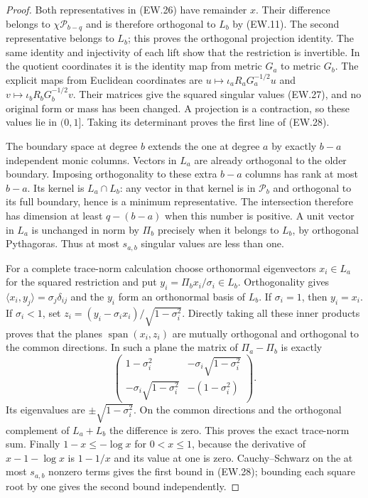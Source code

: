 \begin{proof}
Both representatives in (EW.26) have remainder $x$. Their difference
belongs to $\chi\mathcal P_{b-q}$ and is therefore orthogonal to
$L_b$ by (EW.11). The second representative belongs to $L_b$;
this proves the orthogonal projection identity. The same identity
and injectivity of each lift show that the restriction is invertible.
In the quotient coordinates it is the identity map from metric
$G_a$ to metric $G_b$. The explicit maps from Euclidean coordinates
are $u\mapsto\iota_aR_aG_a^{-1/2}u$ and
$v\mapsto\iota_bR_bG_b^{-1/2}v$. Their matrices give the squared
singular values (EW.27), and no original form or mass has been
changed. A projection is a contraction, so these values lie in
$(0,1]$. Taking its determinant proves the first line of (EW.28).

The boundary space at degree $b$ extends the one at degree $a$ by
exactly $b-a$ independent monic columns. Vectors in $L_a$ are
already orthogonal to the older boundary. Imposing orthogonality to
these extra $b-a$ columns has rank at most $b-a$. Its kernel is
$L_a\cap L_b$: any vector in that kernel is in $\mathcal P_b$
and orthogonal to its full boundary, hence is a minimum representative.
The intersection therefore has dimension at least $q-(b-a)$ when
this number is positive. A unit vector in $L_a$ is unchanged in
norm by $\Pi_b$ precisely when it belongs to $L_b$, by orthogonal
Pythagoras. Thus at most $s_{a,b}$ singular values are less than one.

For a complete trace-norm calculation choose orthonormal eigenvectors
$x_i\in L_a$ for the squared restriction and put
$y_i=\Pi_bx_i/\sigma_i\in L_b$. Orthogonality gives
$\langle x_i,y_j\rangle=\sigma_j\delta_{ij}$ and the $y_i$
form an orthonormal basis of $L_b$. If $\sigma_i=1$, then
$y_i=x_i$. If $\sigma_i<1$, set
$z_i=(y_i-\sigma_ix_i)/\sqrt{1-\sigma_i^2}$.
Directly taking all these inner products proves that the planes
$\operatorname{span}(x_i,z_i)$ are mutually orthogonal and
orthogonal to the common directions. In such a plane the matrix of
$\Pi_a-\Pi_b$ is exactly
\[
 \begin{pmatrix}
 1-\sigma_i^2&-\sigma_i\sqrt{1-\sigma_i^2}\\
 -\sigma_i\sqrt{1-\sigma_i^2}&-(1-\sigma_i^2)
 \end{pmatrix}.
\]
Its eigenvalues are $\pm\sqrt{1-\sigma_i^2}$. On the common
directions and the orthogonal complement of $L_a+L_b$ the
difference is zero. This proves the exact trace-norm sum.
Finally $1-x\le-\log x$ for $0<x\le1$, because the
derivative of $x-1-\log x$ is $1-1/x$ and its value at one is
zero. Cauchy--Schwarz on the at most $s_{a,b}$ nonzero terms gives
the first bound in (EW.28); bounding each square root by one gives
the second bound independently.
\end{proof}

